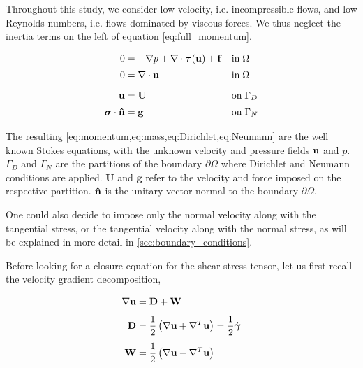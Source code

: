 \documentclass[11 pt]{report}
\begin{document}
Throughout this study, we consider low velocity, i.e. incompressible flows, and low Reynolds numbers, i.e. flows dominated by viscous forces. We thus neglect the inertia terms on the left of equation \eqref{eq:full_momentum}. 
\begin{empheqboxed}
    \begin{align}
        0 &= -\nabla p + \nabla \cdot \boldsymbol \tau(\mathbf{u}) + \mathbf{f} &&\text{in} \; \Omega \label{eq:momentum} \\[2pt]
        0 &= \nabla \cdot \mathbf{u} &&\text{in}\; \Omega \label{eq:mass}\\[6pt]
        \mathbf{u} &= \mathbf{U} &&\text{on}\; \Gamma_{D} \label{eq:Dirichlet}\\[2pt]
        \boldsymbol \sigma \cdot \mathbf{\hat n} &= \mathbf{g} &&\text{on}\; \Gamma_{N} \label{eq:Neumann}
    \end{align}
\end{empheqboxed}
The resulting \cref{eq:momentum,eq:mass,eq:Dirichlet,eq:Neumann} are the well known Stokes equations, with the unknown velocity and pressure fields $\mathbf{u}$ and $p$. $\Gamma_D$ and $\Gamma_N$ are the partitions of the boundary $\partial \Omega$ where Dirichlet and Neumann conditions are applied. $\mathbf{U}$ and $\mathbf{g}$ refer to the velocity and force imposed on the respective partition. $\mathbf{\hat n}$ is the unitary vector normal to the boundary $\partial \Omega$.

One could also decide to impose only the normal velocity along with the tangential stress, or the tangential velocity along with the normal stress, as will be explained in more detail in \cref{sec:boundary_conditions}.

Before looking for a closure equation for the shear stress tensor, let us first recall the velocity gradient decomposition,
\begin{empheqboxed}
    \begin{align}
        \nabla \mathbf{u} &= \mathbf{D} + \mathbf{W}\\[4pt]
        \mathbf{D} &= \frac{1}{2} \left(\nabla \mathbf{u} + \nabla^T \mathbf{u}\right) = \frac{1}{2} \boldsymbol{\dot \gamma}\\[4pt]
        \mathbf{W} &= \frac{1}{2} \left(\nabla \mathbf{u} - \nabla^T \mathbf{u}\right)
    \end{align}
\end{empheqboxed}
\end{document}
